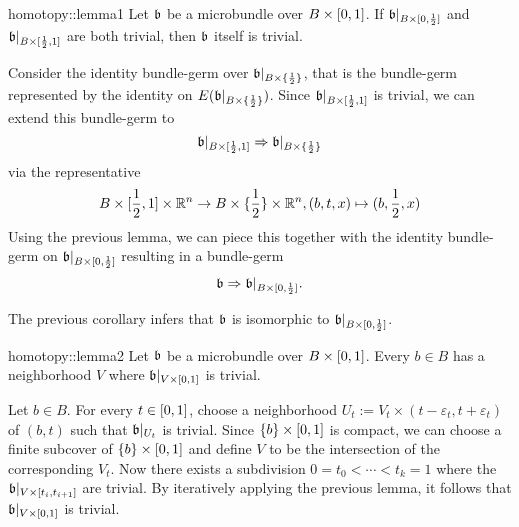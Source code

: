\begin{scope}
\newcommand{\A}[1][] {
    A_\alpha#1
}

\newcommand{\bbleft} {
    \bb\restr{B \times{} [0, \half]}
}
\newcommand{\bbright} {
    \bb\restr{B \times{} [\half, 1]}
}
\newcommand{\bbhalf} {
    \bb\restr{B \times{} \{ \half \}}
}

\begin{mylemma}{homotopy::lemma1}
    Let $\mathfrak{b}$ be a microbundle over $B \times [0, 1]$. If $\bbleft$ and $\bbright$ are both trivial,
    then $\mathfrak{b}$ itself is trivial.
\end{mylemma}
\begin{myproof}
    Consider the identity bundle-germ over $\bbhalf$, that is the bundle-germ represented by the identity on $E(\bbhalf)$.
    Since $\bbright$ is trivial, we can extend this bundle-germ to 
    \[ \bbright \double \bbhalf \]
    via the representative
    \[ B \times [\frac{1}{2}, 1] \times \mathbb{R}^n \to B \times \{\frac{1}{2}\} \times \mathbb{R}^n, (b, t, x) \mapsto (b, \frac{1}{2}, x) \]
    Using the previous lemma, we can piece this together with the identity bundle-germ on $\bbleft$ resulting in a bundle-germ
    \[ \bb \double \bbleft. \]

    The previous corollary infers that $\mathfrak{b}$ is isomorphic to $\bbleft$.
\end{myproof}

\begin{mylemma}{homotopy::lemma2}
    Let $\mathfrak{b}$ be a microbundle over $B \times [0, 1]$.
    Every $b \in B$ has a neighborhood $V$ where $\mathfrak{b}\vert_{V \times [0, 1]}$ is trivial.
\end{mylemma}
\begin{myproof}
    Let $b \in B$.
    For every $t \in [0, 1]$, choose a neighborhood $U_t := V_t \times (t - \varepsilon_t, t + \varepsilon_t)$ of $(b, t)$ such that $\mathfrak{b}\vert_{U_t}$ is trivial.
    Since $\{b\} \times [0, 1]$ is compact, we can choose a finite subcover of $\{b\} \times [0, 1]$ and define $V$ to be the intersection of the corresponding $V_t$.
    Now there exists a subdivision $0 = t_0 < \cdots < t_k = 1$ where the $\mathfrak{b}\vert_{V \times [t_{i}, t_{i + 1}]}$ are trivial.
    By iteratively applying the previous lemma, it follows that $\mathfrak{b}\vert_{V \times [0, 1]}$ is trivial.
\end{myproof}


\end{scope}
